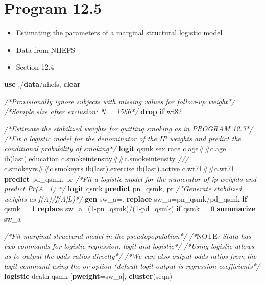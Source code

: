 \documentclass[
  10pt,
]{book}
\newenvironment{Shaded}{\begin{snugshade}}{\end{snugshade}}
\newcommand{\AlertTok}[1]{\textcolor[rgb]{0.94,0.16,0.16}{#1}}
\newcommand{\CommentTok}[1]{\textcolor[rgb]{0.56,0.35,0.01}{\textit{#1}}}
\newcommand{\FunctionTok}[1]{\textcolor[rgb]{0.00,0.00,0.00}{#1}}
\newcommand{\KeywordTok}[1]{\textcolor[rgb]{0.13,0.29,0.53}{\textbf{#1}}}
\newcommand{\NormalTok}[1]{#1}
\providecommand{\tightlist}{%
  \setlength{\itemsep}{0pt}\setlength{\parskip}{0pt}}
\begin{document}
\hypertarget{program-12.5}{%
\section{Program 12.5}\label{program-12.5}}

\begin{itemize}
\tightlist
\item
  Estimating the parameters of a marginal structural logistic model
\item
  Data from NHEFS
\item
  Section 12.4
\end{itemize}

\begin{Shaded}
\begin{Highlighting}[]
\KeywordTok{use}\NormalTok{ ./}\KeywordTok{data}\NormalTok{/nhefs, }\KeywordTok{clear}

\CommentTok{/*Provisionally ignore subjects with missing values for follow-up weight*/}
\CommentTok{/*Sample size after exclusion: N = 1566*/}
\KeywordTok{drop} \KeywordTok{if}\NormalTok{ wt82==.}

\CommentTok{/*Estimate the stabilized weights for quitting smoking as in PROGRAM 12.3*/}
\CommentTok{/*Fit a logistic model for the denominator of the IP weights and predict the conditional probability of smoking*/} 
\KeywordTok{logit}\NormalTok{ qsmk sex race c.age##c.age ib(}\FunctionTok{last}\NormalTok{).education c.smokeintensity##c.smokeintensity }\CommentTok{///}
\NormalTok{c.smokeyrs##c.smokeyrs ib(}\FunctionTok{last}\NormalTok{).exercise ib(}\FunctionTok{last}\NormalTok{).active c.wt71##c.wt71  }
\KeywordTok{predict}\NormalTok{ pd_qsmk, pr}
\CommentTok{/*Fit a logistic model for the numerator of ip weights and predict Pr(A=1) */} 
\KeywordTok{logit}\NormalTok{ qsmk }
\KeywordTok{predict}\NormalTok{ pn_qsmk, pr}
\CommentTok{/*Generate stabilized weights as f(A)/f(A|L)*/}
\KeywordTok{gen}\NormalTok{ sw_a=.}
\KeywordTok{replace}\NormalTok{ sw_a=pn_qsmk/pd_qsmk }\KeywordTok{if}\NormalTok{ qsmk==1}
\KeywordTok{replace}\NormalTok{ sw_a=(1-pn_qsmk)/(1-pd_qsmk) }\KeywordTok{if}\NormalTok{ qsmk==0}
\KeywordTok{summarize}\NormalTok{ sw_a}

\CommentTok{/*Fit marginal structural model in the pseudopopulation*/}
\CommentTok{/*}\AlertTok{NOTE}\CommentTok{: Stata has two commands for logistic regression, logit and logistic*/}
\CommentTok{/*Using logistic allows us to output the odds ratios directly*/}
\CommentTok{/*We can also output odds ratios from the logit command using the or option (default logit output is regression coefficients*/}
\KeywordTok{logistic}\NormalTok{ death qsmk [}\KeywordTok{pweight}\NormalTok{=sw_a], }\KeywordTok{cluster}\NormalTok{(seqn) }
\end{Highlighting}
\end{Shaded}
\end{document}
